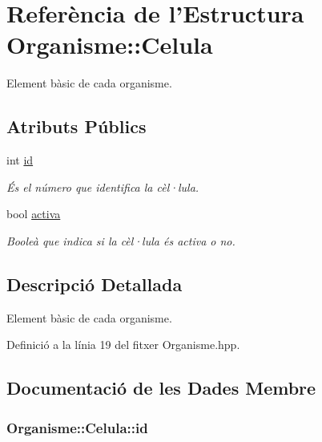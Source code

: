 \hypertarget{struct_organisme_1_1_celula}{\section{Referència de l'Estructura Organisme\-:\-:Celula}
\label{struct_organisme_1_1_celula}
}


Element bàsic de cada organisme.  


\subsection*{Atributs Públics}
\begin{DoxyCompactItemize}
\item 
int \hyperlink{struct_organisme_1_1_celula_a6ec9fac60cf77abda04fbe2d2c8eb43f}{id}
\begin{DoxyCompactList}\small\item\em És el número que identifica la cèl·lula. \end{DoxyCompactList}\item 
bool \hyperlink{struct_organisme_1_1_celula_ae76b8fe2263311c1a52e4fba8f649114}{activa}
\begin{DoxyCompactList}\small\item\em Booleà que indica si la cèl·lula és activa o no. \end{DoxyCompactList}\end{DoxyCompactItemize}


\subsection{Descripció Detallada}
Element bàsic de cada organisme. 

Definició a la línia 19 del fitxer Organisme.\-hpp.



\subsection{Documentació de les Dades Membre}
\hypertarget{struct_organisme_1_1_celula_a6ec9fac60cf77abda04fbe2d2c8eb43f}{
\subsubsection[{id}]{\setlength{\rightskip}{0pt plus 5cm}Organisme\-::\-Celula\-::id}}\label{struct_organisme_1_1_celula_a6ec9fac60cf77abda04fbe2d2c8eb43f}


